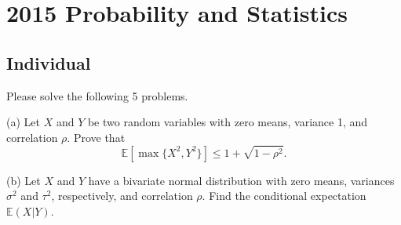 \section{2015 Probability and Statistics}

\subsection{Individual}
Please solve the following 5 problems.

\begin{exercise}\label{probability:2015:1}
(a) Let $X$ and $Y$ be two random variables with zero means, variance 1, and correlation $\rho$. Prove that
\[
\mathbb{E}[\max\{X^2, Y^2\}] \leq 1 + \sqrt{1-\rho^2}.
\]

(b) Let $X$ and $Y$ have a bivariate normal distribution with zero means, variances $\sigma^2$ and $\tau^2$, respectively, and correlation $\rho$. Find the conditional expectation $\mathbb{E}(X | Y)$.
\end{exercise}

